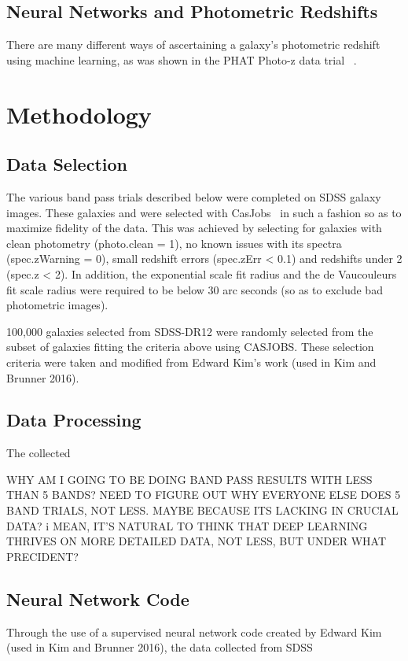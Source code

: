 \documentclass[fleqn,usenatbib]{mnras}
\begin{document}
\subsection{Neural Networks and Photometric Redshifts}
  \label{sec:nn_and_photoz}

There are many different ways of ascertaining a galaxy's photometric redshift using machine learning, as was shown in the PHAT Photo-z data trial ~\citep{hildebrandt_phat}.
  
\section{Methodology}
  \label{sec:method}

\subsection{Data Selection}
   \label{sec:data_sel}   
The various band pass trials described below were completed on SDSS galaxy images.  These galaxies and were selected with CasJobs~\citep{li_casjobs_2008} in such a fashion so as to maximize fidelity of the data.  This was achieved by selecting for galaxies with clean photometry (photo.clean = 1), no known issues with its spectra (spec.zWarning = 0), small redshift errors (spec.zErr < 0.1) and redshifts under 2 (spec.z < 2).  In addition, the exponential scale fit radius and the de Vaucouleurs fit scale radius were required to be below 30 arc seconds (so as to exclude bad photometric images).

100,000 galaxies selected from SDSS-DR12 were randomly selected from the subset of galaxies fitting the criteria above using CASJOBS.  These selection criteria were taken and modified from Edward Kim's work (used in Kim and Brunner 2016).

\subsection{Data Processing}
  \label{sec:data_proc}
The collected 

WHY AM I GOING TO BE DOING BAND PASS RESULTS WITH LESS THAN 5 BANDS? NEED TO FIGURE OUT WHY EVERYONE ELSE DOES 5 BAND TRIALS, NOT LESS.  MAYBE BECAUSE ITS LACKING IN CRUCIAL DATA? i MEAN, IT'S NATURAL TO THINK THAT DEEP LEARNING THRIVES ON MORE DETAILED DATA, NOT LESS, BUT UNDER WHAT PRECIDENT?


\subsection{Neural Network Code}
  \label{sec:code}
Through the use of a supervised neural network code created by Edward Kim (used in Kim and Brunner 2016), the data collected from SDSS
\end{document}
